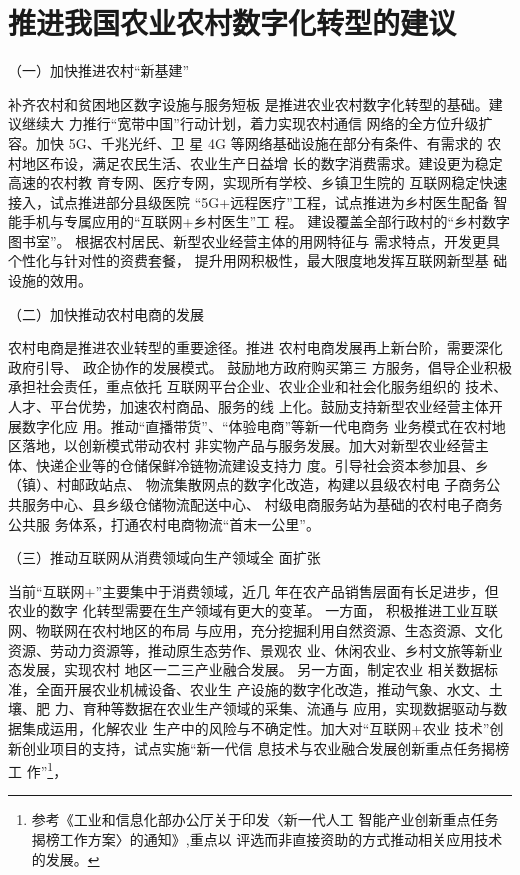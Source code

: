 \documentclass[a4paper]{article}
\begin{document}
\section{推进我国农业农村数字化转型的建议}
 {\fangsong （一）加快推进农村“新基建”}
\par
补齐农村和贫困地区数字设施与服务短板
是推进农业农村数字化转型的基础。建议继续大
力推行“宽带中国”行动计划，着力实现农村通信
网络的全方位升级扩容。加快 5G、千兆光纤、卫
星 4G 等网络基础设施在部分有条件、有需求的
农村地区布设，满足农民生活、农业生产日益增
长的数字消费需求。建设更为稳定高速的农村教
育专网、医疗专网，实现所有学校、乡镇卫生院的
互联网稳定快速接入，试点推进部分县级医院
“5G+远程医疗”工程，试点推进为乡村医生配备
智能手机与专属应用的“互联网+乡村医生”工
程。 建设覆盖全部行政村的“乡村数字图书室”。
根据农村居民、新型农业经营主体的用网特征与
需求特点，开发更具个性化与针对性的资费套餐，
提升用网积极性，最大限度地发挥互联网新型基
础设施的效用。
\par
{\fangsong （二）加快推动农村电商的发展}
\par
农村电商是推进农业转型的重要途径。推进
农村电商发展再上新台阶，需要深化政府引导、
政企协作的发展模式。 鼓励地方政府购买第三
方服务，倡导企业积极承担社会责任，重点依托
互联网平台企业、农业企业和社会化服务组织的
技术、人才、平台优势，加速农村商品、服务的线
上化。鼓励支持新型农业经营主体开展数字化应
用。推动“直播带货”、“体验电商”等新一代电商务
业务模式在农村地区落地，以创新模式带动农村
非实物产品与服务发展。加大对新型农业经营主
体、快递企业等的仓储保鲜冷链物流建设支持力
度。引导社会资本参加县、乡（{\fangsong 镇}）、村邮政站点、
物流集散网点的数字化改造，构建以县级农村电
子商务公共服务中心、县乡级仓储物流配送中心、
村级电商服务站为基础的农村电子商务公共服
务体系，打通农村电商物流“首末一公里”。
\par
{\fangsong （三）推动互联网从消费领域向生产领域全
	面扩张}
\par
当前“互联网+”主要集中于消费领域，近几
年在农产品销售层面有长足进步，但农业的数字
化转型需要在生产领域有更大的变革。 一方面，
积极推进工业互联网、物联网在农村地区的布局
与应用，充分挖掘利用自然资源、生态资源、文化
资源、劳动力资源等，推动原生态劳作、景观农
业、休闲农业、乡村文旅等新业态发展，实现农村
地区一二三产业融合发展。 另一方面，制定农业
相关数据标准，全面开展农业机械设备、农业生
产设施的数字化改造，推动气象、水文、土壤、肥
力、育种等数据在农业生产领域的采集、流通与
应用，实现数据驱动与数据集成运用，化解农业
生产中的风险与不确定性。加大对“互联网+农业
技术”创新创业项目的支持，试点实施“新一代信
息技术与农业融合发展创新重点任务揭榜工
作”\footnote{参考《工业和信息化部办公厅关于印发〈新一代人工
	智能产业创新重点任务揭榜工作方案〉的通知》,重点以
	评选而非直接资助的方式推动相关应用技术的发展。}，
\end{document}
